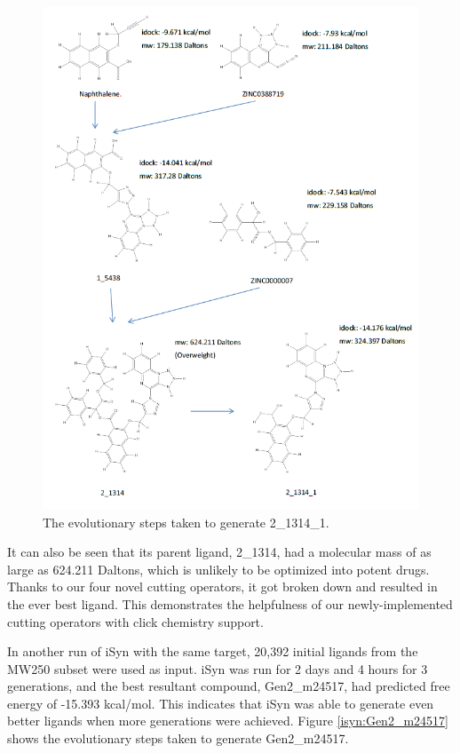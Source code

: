 \begin{figure}
\begin{center}
\includegraphics[width=\linewidth]{../isyn/2_1314_1.png}
\end{center}
\caption{The evolutionary steps taken to generate 2\_1314\_1.}
\label{isyn:2_1314_1}
\end{figure}

It can also be seen that its parent ligand, 2\_1314, had a molecular mass of as large as 624.211 Daltons, which is unlikely to be optimized into potent drugs. Thanks to our four novel cutting operators, it got broken down and resulted in the ever best ligand. This demonstrates the helpfulness of our newly-implemented cutting operators with click chemistry support.

In another run of iSyn with the same target, 20,392 initial ligands from the MW250 subset were used as input. iSyn was run for 2 days and 4 hours for 3 generations, and the best resultant compound, Gen2\_m24517, had predicted free energy of -15.393 kcal/mol. This indicates that iSyn was able to generate even better ligands when more generations were achieved. Figure \ref{isyn:Gen2_m24517} shows the evolutionary steps taken to generate Gen2\_m24517.

